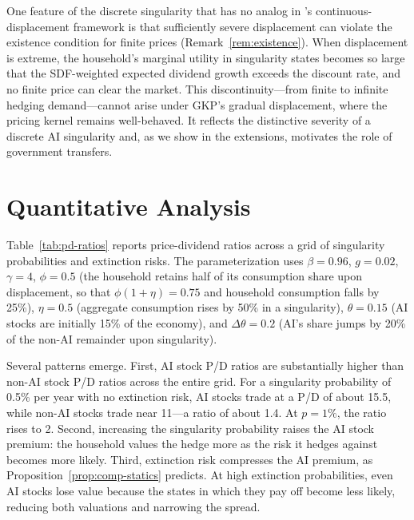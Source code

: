 \documentclass[12pt]{article}
\begin{document}
One feature of the discrete singularity that has no analog in \citet{GKP2012}'s continuous-displacement framework is that sufficiently severe displacement can violate the existence condition for finite prices (Remark~\ref{rem:existence}). When displacement is extreme, the household's marginal utility in singularity states becomes so large that the SDF-weighted expected dividend growth exceeds the discount rate, and no finite price can clear the market. This discontinuity---from finite to infinite hedging demand---cannot arise under GKP's gradual displacement, where the pricing kernel remains well-behaved. It reflects the distinctive severity of a discrete AI singularity and, as we show in the extensions, motivates the role of government transfers.

\section{Quantitative Analysis} \label{sec:quant} %

\begin{table}[t]
\centering
\caption{Price-Dividend Ratios: AI Stocks vs.\ Non-AI Stocks}
\label{tab:pd-ratios} %

\end{table}

Table~\ref{tab:pd-ratios} reports price-dividend ratios across a grid of singularity probabilities and extinction risks. The parameterization uses $\beta = 0.96$, $g = 0.02$, $\gamma = 4$, $\phi = 0.5$ (the household retains half of its consumption share upon displacement, so that $\phi(1+\eta) = 0.75$ and household consumption falls by 25\%), $\eta = 0.5$ (aggregate consumption rises by 50\% in a singularity), $\theta = 0.15$ (AI stocks are initially 15\% of the economy), and $\Delta\theta = 0.2$ (AI's share jumps by 20\% of the non-AI remainder upon singularity).

Several patterns emerge. First, AI stock P/D ratios are substantially higher than non-AI stock P/D ratios across the entire grid. For a singularity probability of 0.5\% per year with no extinction risk, AI stocks trade at a P/D of about 15.5, while non-AI stocks trade near 11---a ratio of about 1.4. At $p = 1\%$, the ratio rises to 2. Second, increasing the singularity probability raises the AI stock premium: the household values the hedge more as the risk it hedges against becomes more likely. Third, extinction risk compresses the AI premium, as Proposition~\ref{prop:comp-statics} predicts. At high extinction probabilities, even AI stocks lose value because the states in which they pay off become less likely, reducing both valuations and narrowing the spread.
\end{document}
